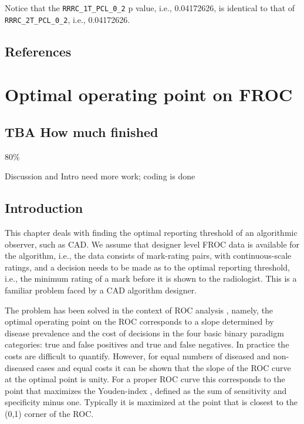 \documentclass[
]{book}
\begin{document}
Notice that the \texttt{RRRC\_1T\_PCL\_0\_2} p value, i.e., 0.04172626, is identical to that of \texttt{RRRC\_2T\_PCL\_0\_2}, i.e., 0.04172626.

\hypertarget{standalone-cad-radiologists-references}{%
\section{References}\label{standalone-cad-radiologists-references}}

\hypertarget{optim-op-point}{%
\chapter{Optimal operating point on FROC}\label{optim-op-point}}

\hypertarget{optim-op-point-how-much-finished}{%
\section{TBA How much finished}\label{optim-op-point-how-much-finished}}

80\%

Discussion and Intro need more work; coding is done

\hypertarget{optim-op-point-intro}{%
\section{Introduction}\label{optim-op-point-intro}}

This chapter deals with finding the optimal reporting threshold of an algorithmic observer, such as CAD. We assume that designer level FROC data is available for the algorithm, i.e., the data consists of mark-rating pairs, with continuous-scale ratings, and a decision needs to be made as to the optimal reporting threshold, i.e., the minimum rating of a mark before it is shown to the radiologist. This is a familiar problem faced by a CAD algorithm designer.

The problem has been solved in the context of ROC analysis \citep{metz1978rocmethodology}, namely, the optimal operating point on the ROC corresponds to a slope determined by disease prevalence and the cost of decisions in the four basic binary paradigm categories: true and false positives and true and false negatives. In practice the costs are difficult to quantify. However, for equal numbers of diseased and non-diseased cases and equal costs it can be shown that the slope of the ROC curve at the optimal point is unity. For a proper ROC curve this corresponds to the point that maximizes the Youden-index \citep{youden1950index}, defined as the sum of sensitivity and specificity minus one. Typically it is maximized at the point that is closest to the (0,1) corner of the ROC.
\end{document}
